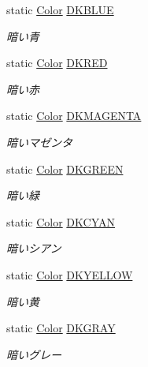 \begin{DoxyCompactItemize}
static \hyperlink{struct_color}{Color} \hyperlink{struct_color_a29144a41c4da4a4e27866a0064d9345e}{D\-K\-B\-L\-U\-E}
\begin{DoxyCompactList}\small\item\em 暗い青 \end{DoxyCompactList}\item 
static \hyperlink{struct_color}{Color} \hyperlink{struct_color_a0d0107a528629520d371afd0953b2160}{D\-K\-R\-E\-D}
\begin{DoxyCompactList}\small\item\em 暗い赤 \end{DoxyCompactList}\item 
static \hyperlink{struct_color}{Color} \hyperlink{struct_color_a522efed53460f090f7b9e5305bca1b9d}{D\-K\-M\-A\-G\-E\-N\-T\-A}
\begin{DoxyCompactList}\small\item\em 暗いマゼンタ \end{DoxyCompactList}\item 
static \hyperlink{struct_color}{Color} \hyperlink{struct_color_a86b20427e2e318d3fe348d031a0260c1}{D\-K\-G\-R\-E\-E\-N}
\begin{DoxyCompactList}\small\item\em 暗い緑 \end{DoxyCompactList}\item 
static \hyperlink{struct_color}{Color} \hyperlink{struct_color_a850a0d2e889fc42aa9bb6a7c09283572}{D\-K\-C\-Y\-A\-N}
\begin{DoxyCompactList}\small\item\em 暗いシアン \end{DoxyCompactList}\item 
static \hyperlink{struct_color}{Color} \hyperlink{struct_color_a89ed0e31f59c81ead3b5dc4cfc6a3e3a}{D\-K\-Y\-E\-L\-L\-O\-W}
\begin{DoxyCompactList}\small\item\em 暗い黄 \end{DoxyCompactList}\item 
static \hyperlink{struct_color}{Color} \hyperlink{struct_color_a2028ad15ab7689719579fa5859a9f233}{D\-K\-G\-R\-A\-Y}
\begin{DoxyCompactList}\small\item\em 暗いグレー \end{DoxyCompactList}\end{DoxyCompactItemize}


